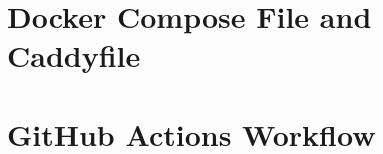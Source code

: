\documentclass[12pt, a4paper, oneside]{report}
\begin{document}




\chapter{Docker Compose File and Caddyfile}
\label{app:docker-compose}





\chapter{GitHub Actions Workflow}
\label{app:gha-workflow}


\end{document}
